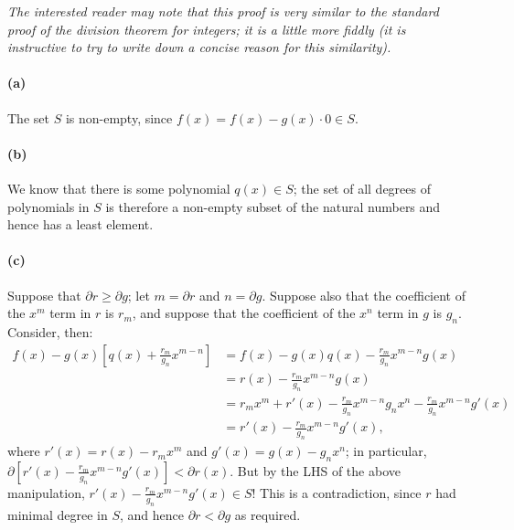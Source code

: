 \documentclass[a4paper,10pt]{article}
\begin{document}
\begin{mdframed}[hidealllines=true,backgroundcolor=Emerald!20]
\textit{The interested reader may note that this proof is very similar to the standard proof of the division theorem for integers; it is a little more
        fiddly (it is instructive to try to write down a concise reason for this similarity).}
\end{mdframed}

\paragraph{(a)}
The set $ S $ is non-empty, since $ f(x) = f(x) - g(x) \cdot 0 \in S $.

\paragraph{(b)}
We know that there is some polynomial $ q(x) \in S $; the set of all degrees of polynomials in $ S $ is therefore a non-empty subset of the natural numbers
and hence has a least element.

\paragraph{(c)}
Suppose that $ \partial r \geq \partial g $; let $ m = \partial r $ and $ n = \partial g $. Suppose also that the coefficient of the $ x^m $ term in $ r $
is $ r_m $, and suppose that the coefficient of the $ x^n $ term in $ g $ is $ g_n $. Consider, then:
\begin{align*}
  f(x) - g(x) \left[ q(x) + \frac{r_m}{g_n} x^{m - n} \right] &= f(x) - g(x) q(x) - \frac{r_m}{g_n} x^{m - n} g(x)\\
                                                              &= r(x) - \frac{r_m}{g_n} x^{m - n} g(x) \\
                                                              &= r_m x^m + r'(x) - \frac{r_m}{g_n} x^{m - n} g_n x^n - \frac{r_m}{g_n} x^{m - n} g'(x)\\
                                                              &= r'(x) - \frac{r_m}{g_n} x^{m - n} g'(x),
\end{align*}
where $ r'(x) = r(x) - r_m x^m $ and $ g'(x) = g(x) - g_n x^n $; in particular, $ \partial[r'(x) - \frac{r_m}{g_n} x^{m - n} g'(x)] < \partial r(x) $. But
by the LHS of the above manipulation, $ r'(x) - \frac{r_m}{g_n} x^{m - n} g'(x) \in S $! This is a contradiction, since $ r $ had minimal degree in $ S $,
and hence $ \partial r < \partial g $ as required.
\end{document}
